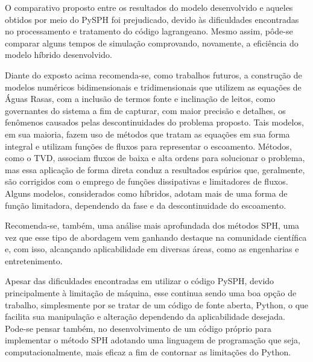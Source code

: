 O comparativo proposto entre os resultados do modelo desenvolvido e aqueles obtidos por meio do PySPH foi prejudicado, devido às dificuldades encontradas no processamento e tratamento do código lagrangeano. Mesmo assim, pôde-se comparar alguns tempos de simulação comprovando, novamente, a eficiência do modelo híbrido desenvolvido.

Diante do exposto acima recomenda-se, como trabalhos futuros, a construção de modelos numéricos bidimensionais e tridimensionais que utilizem as equações de Águas Rasas, com a inclusão de termos fonte e inclinação de leitos, como governantes do sistema a fim de capturar, com maior precisão e detalhes, os fenômenos causados pelas descontinuidades do problema proposto. Tais modelos, em sua maioria, fazem uso de métodos que tratam as equações em sua forma integral e utilizam funções de fluxos para representar o escoamento. Métodos, como o TVD, associam fluxos de baixa e alta ordens para solucionar o problema, mas essa aplicação de forma direta conduz a resultados espúrios que, geralmente, são corrigidos com o emprego de funções dissipativas e limitadores de fluxos. Alguns modelos, considerados como híbridos, adotam mais de uma forma de função limitadora, dependendo da fase e da descontinuidade do escoamento. 

Recomenda-se, também, uma análise mais aprofundada dos métodos SPH, uma vez que esse tipo de abordagem vem ganhando destaque na comunidade científica e, com isso, alcançando aplicabilidade em diversas áreas, como as engenharias e entretenimento. 

Apesar das dificuldades encontradas em utilizar o código PySPH,  devido principalmente à limitação de máquina, esse continua sendo uma boa opção de trabalho, simplesmente por se tratar de um código de fonte aberta, Python, o que facilita sua manipulação e alteração dependendo da aplicabilidade desejada. Pode-se pensar também, no desenvolvimento de um código próprio para implementar o método SPH adotando uma linguagem de programação que seja, computacionalmente, mais eficaz a fim de contornar as limitações do Python.         

  

 

